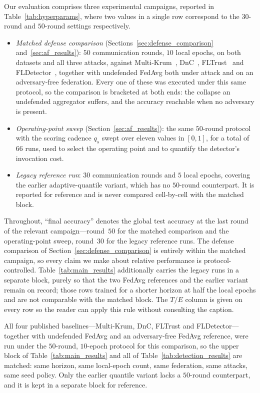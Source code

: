 \documentclass[journal]{IEEEtran}
\begin{document}
Our evaluation comprises three experimental campaigns, reported in Table~\ref{tab:hyperparams}, where two values in a single row correspond to the $30$-round and $50$-round settings respectively.
\begin{itemize}
    \item \emph{Matched defense comparison} (Sections~\ref{sec:defense_comparison} and~\ref{sec:af_results}): $50$ communication rounds, $10$ local epochs, on both datasets and all three attacks, against Multi-Krum~\cite{blanchard2017machine}, DnC~\cite{shejwalkar2021manipulating}, FLTrust~\cite{cao2020fltrust} and FLDetector~\cite{zhang2022fldetector}, together with undefended FedAvg both under attack and on an adversary-free federation. Every one of these was executed under this same protocol, so the comparison is bracketed at both ends: the collapse an undefended aggregator suffers, and the accuracy reachable when no adversary is present.
    \item \emph{Operating-point sweep} (Section~\ref{sec:af_results}): the same $50$-round protocol with the scoring cadence $q_s$ swept over eleven values in $[0,1]$, for a total of $66$ runs, used to select the operating point and to quantify the detector's invocation cost.
    \item \emph{Legacy reference run}: $30$ communication rounds and $5$ local epochs, covering the earlier adaptive-quantile variant, which has no $50$-round counterpart. It is reported for reference and is never compared cell-by-cell with the matched block.
\end{itemize}

Throughout, ``final accuracy'' denotes the global test accuracy at the last round of the relevant campaign---round~$50$ for the matched comparison and the operating-point sweep, round~$30$ for the legacy reference runs. The defense comparison of Section~\ref{sec:defense_comparison} is entirely within the matched campaign, so every claim we make about relative performance is protocol-controlled. Table~\ref{tab:main_results} additionally carries the legacy runs in a separate block, purely so that the two FedAvg references and the earlier variant remain on record; those rows trained for a shorter horizon at half the local epochs and are not comparable with the matched block. The $T/E$ column is given on every row so the reader can apply this rule without consulting the caption.

All four published baselines---Multi-Krum, DnC, FLTrust and FLDetector---together with undefended FedAvg and an adversary-free FedAvg reference, were run under the $50$-round, $10$-epoch protocol for this comparison, so the upper block of Table~\ref{tab:main_results} and all of Table~\ref{tab:detection_results} are matched: same horizon, same local-epoch count, same federation, same attacks, same seed policy. Only the earlier quantile variant lacks a $50$-round counterpart, and it is kept in a separate block for reference.
\end{document}
